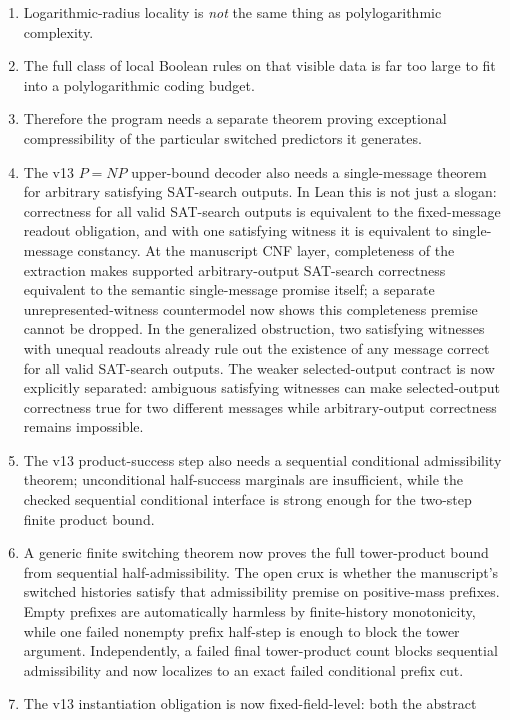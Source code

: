 \documentclass[11pt]{article}
\theoremstyle{remark}
\begin{document}
\begin{enumerate}[leftmargin=1.5em]
  \item Logarithmic-radius locality is \emph{not} the same thing as polylogarithmic complexity.
  \item The full class of local Boolean rules on that visible data is far too large to fit into a
  polylogarithmic coding budget.
  \item Therefore the program needs a separate theorem proving exceptional compressibility
  of the particular switched predictors it generates.
  \item The v13 \(P=NP\) upper-bound decoder also needs a single-message theorem for arbitrary
  satisfying SAT-search outputs.  In Lean this is not just a slogan: correctness for all valid
  SAT-search outputs is equivalent to the fixed-message readout obligation, and with one satisfying
  witness it is equivalent to single-message constancy.  At the manuscript CNF layer, completeness
  of the extraction makes supported arbitrary-output SAT-search correctness equivalent to the
  semantic single-message promise itself; a separate unrepresented-witness countermodel now shows
  this completeness premise cannot be dropped.  In the generalized obstruction, two satisfying witnesses
  with unequal readouts already rule out the existence of any message correct for all valid
  SAT-search outputs.  The weaker selected-output contract is now explicitly separated: ambiguous
  satisfying witnesses can make selected-output correctness true for two different messages while
  arbitrary-output correctness remains impossible.
  \item The v13 product-success step also needs a sequential conditional admissibility theorem;
  unconditional half-success marginals are insufficient, while the checked sequential conditional
  interface is strong enough for the two-step finite product bound.
  \item A generic finite switching theorem now proves the full tower-product bound from sequential
  half-admissibility.  The open crux is whether the manuscript's switched histories satisfy that
  admissibility premise on positive-mass prefixes.  Empty prefixes are automatically harmless by
  finite-history monotonicity, while one failed nonempty prefix half-step is enough to block the
  tower argument.  Independently, a failed final tower-product count blocks sequential
  admissibility and now localizes to an exact failed conditional prefix cut.
  \item The v13 instantiation obligation is now fixed-field-level: both the abstract

\end{enumerate}
\end{document}
